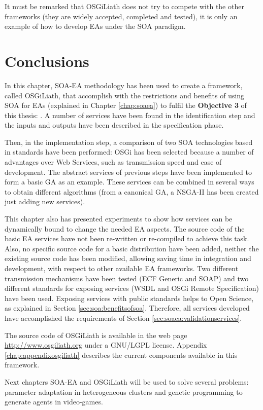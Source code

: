 It must be remarked that OSGiLiath does not try to compete with the
other frameworks (they are widely accepted, completed and tested), it
is only an example of how to develop EAs under the SOA paradigm. %


\section{Conclusions}

In this chapter, SOA-EA methodology has been used to create a framework, called OSGiLiath, that accomplish with the restrictions and benefits of using SOA for EAs (explained in Chapter \ref{chap:soaea}) to fulfil the \textbf{Objective 3} of this thesis: \objectiveframework . A number of services have been found in the identification step and the inputs and outputs have been described in the specification phase. 

Then, in the implementation step, a comparison of two SOA technologies based in standards have been performed: OSGi has been selected because a number of advantages over Web Services, such as transmission speed and ease of development. The abstract services of previous steps have been implemented to form a basic GA as an example. These services can be combined in several ways to obtain different algorithms (from a canonical GA, a NSGA-II has been created just adding new services). 

This chapter also has presented experiments to show how services can be dynamically bound to change the needed EA aspects. The source code of the basic EA services have not been re-written or re-compiled to achieve this task. Also, no specific source code for a basic distribution have been added, neither the existing source code has been modified, allowing saving time in integration and development, with respect to other available EA frameworks. Two different transmission mechanisms have been tested (ECF Generic and SOAP) and two different standards for exposing services (WSDL and OSGi Remote Specification) have been used. Exposing services with public standards helps to Open Science, as explained in Section \ref{sec:soa:benefitsofsoa}. Therefore, all services developed have accomplished the requirements of Section \ref{sec:soaea:validationservices}.

The source code of OSGiLiath is available in the web page \url{http://www.osgiliath.org} under a GNU/LGPL license. Appendix \ref{chap:appendixosgiliath} describes the current components available in this framework.

Next chapters SOA-EA and OSGiLiath will be used to solve several problems: parameter adaptation in heterogeneous clusters and genetic programming to generate agents in video-games.
